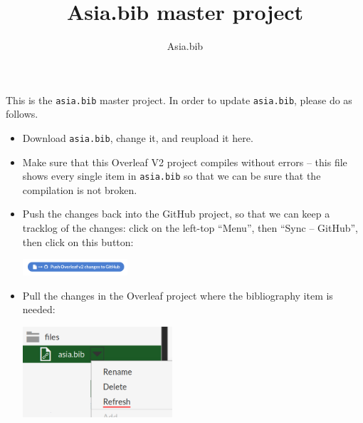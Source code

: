 \documentclass[xetex, svgnames, 12pt]{scrartcl}
\title{Asia.bib master project}
\author{Asia.bib}
\begin{document}
\maketitle

This is the \verb=asia.bib= master project. In order to update \verb=asia.bib=, please do as follows.

\begin{itemize}
\item Download \verb=asia.bib=, change it, and reupload it here.
\item Make sure that this Overleaf V2 project compiles without errors -- this file shows every single item in \verb=asia.bib= so that we can be sure that the compilation is not broken.
\item Push the changes back into the GitHub project, so that we can keep a tracklog of the changes: click on the left-top ``Menu'', then ``Sync -- GitHub'', then click on this button:
\begin{center}
\includegraphics[width=10.5em]{Doc/a.png}
\end{center}
\item Pull the changes in the Overleaf project where the bibliography item is needed:
\begin{center}
\includegraphics[width=15em]{Doc/refresh.png}
\end{center}
\end{itemize}

\nocite{*} %



\end{document}
